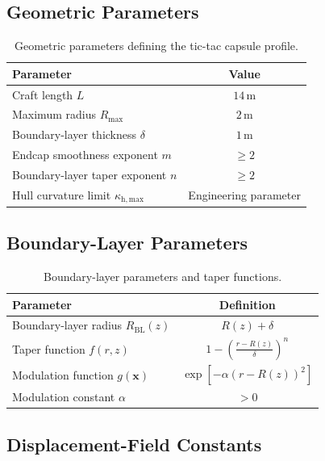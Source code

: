 \documentclass[aip,adv,reprint,floatfix]{revtex4-2}
\begin{document}
\subsection{Geometric Parameters}

\begin{table}[h!]
\centering
\begin{tabular}{l c}
\hline
Parameter & Value \\
\hline
Craft length $L$ & $14\,\mathrm{m}$ \\
Maximum radius $R_{\max}$ & $2\,\mathrm{m}$ \\
Boundary-layer thickness $\delta$ & $1\,\mathrm{m}$ \\
Endcap smoothness exponent $m$ & $\geq 2$ \\
Boundary-layer taper exponent $n$ & $\geq 2$ \\
Hull curvature limit $\kappa_{\mathrm{h,max}}$ & Engineering parameter \\
\hline
\end{tabular}
\caption{Geometric parameters defining the tic-tac capsule profile.}
\end{table}

\subsection{Boundary-Layer Parameters}

\begin{table}[h!]
\centering
\begin{tabular}{l c}
\hline
Parameter & Definition \\
\hline
Boundary-layer radius $R_{\mathrm{BL}}(z)$ & $R(z) + \delta$ \\
Taper function $f(r,z)$ & $1 - \left( \frac{r - R(z)}{\delta} \right)^n$ \\
Modulation function $g(\mathbf{x})$ & $\exp\left[ -\alpha (r - R(z))^2 \right]$ \\
Modulation constant $\alpha$ & $> 0$ \\
\hline
\end{tabular}
\caption{Boundary-layer parameters and taper functions.}
\end{table}

\subsection{Displacement-Field Constants}
\end{document}
